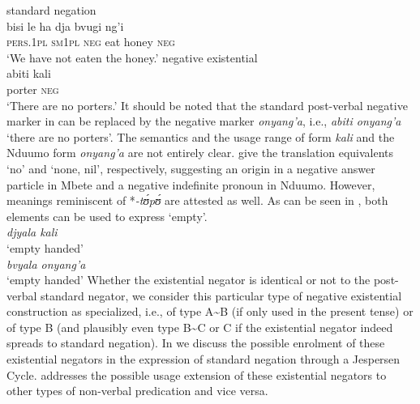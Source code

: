 \documentclass[output=paper]{langscibook}
\begin{document}
\ea\label{ex:mbete-honey-porter}  \ea standard negation\\ \gll bisi le ha dja bvugi ng'i\\
\textsc{pers.1pl} \textsc{sm1pl} \textsc{neg} eat honey \textsc{neg}\\ \glt
`We have not eaten the honey.' \ex negative existential\\ \gll abiti kali\\
porter \textsc{neg}\\ \glt 	`There are no porters.' \z\z It should be noted
that the  standard post-verbal negative marker in
 can be replaced by the negative marker
\textit{onyang'a}, i.e., \textit{abiti onyang'a} `there are no porters'.
The semantics and the usage range of  form \textit{kali} and the
Nduumo form \textit{onyang'a} are not entirely clear. \citet[114,
171]{BitonAdam1969} give the translation equivalents `no' and `none, nil',
respectively, suggesting an origin in a negative answer particle in Mbete
and a negative indefinite pronoun in Nduumo. However, meanings reminiscent
of *\textit{-t{\'ʊ}p{\'ʊ}} are attested as well. As can be seen in
, both elements can be used to express `empty'.
\ea\label{ex:mbete-nduumo-empty} 
\ea{}\\ 
\textit{djyala kali}\\ 
\glt `empty handed'
\ex{}\\ 
\textit{bvyala onyang'a}\\ 
\glt `empty handed' \z\z 
%
Whether the existential negator is identical or
not to the post-verbal standard negator, we consider this particular type
of negative existential construction as specialized, i.e., of type
A{\textasciitilde}B (if only used in the present tense) or of type B (and
plausibly even type B{\textasciitilde}C or C if the existential negator
indeed spreads to standard negation). In  we discuss the
possible enrolment of these existential negators in the expression of
standard negation through a Jespersen Cycle.  addresses
the possible usage extension of these existential negators to other types
of non-verbal predication and vice versa.
\end{document}
